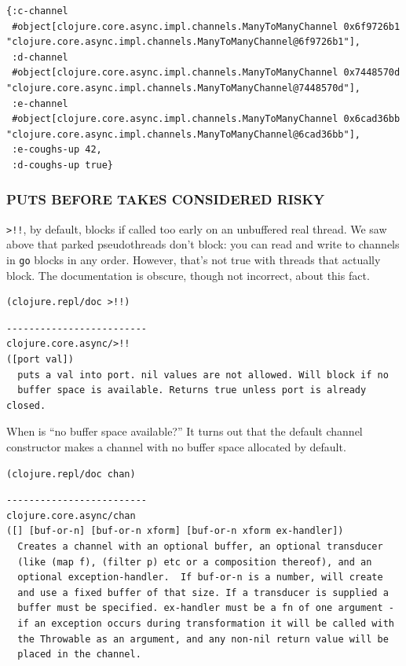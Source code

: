 \documentclass[10pt,oneside,x11names]{article}
\begin{document}
\begin{verbatim}
{:c-channel
 #object[clojure.core.async.impl.channels.ManyToManyChannel 0x6f9726b1 "clojure.core.async.impl.channels.ManyToManyChannel@6f9726b1"],
 :d-channel
 #object[clojure.core.async.impl.channels.ManyToManyChannel 0x7448570d "clojure.core.async.impl.channels.ManyToManyChannel@7448570d"],
 :e-channel
 #object[clojure.core.async.impl.channels.ManyToManyChannel 0x6cad36bb "clojure.core.async.impl.channels.ManyToManyChannel@6cad36bb"],
 :e-coughs-up 42,
 :d-coughs-up true}
\end{verbatim}

\subsubsection{PUTS BEFORE TAKES CONSIDERED RISKY}
\label{puts-before-takes-considered-risky}
\texttt{>!!}, by default, blocks if called too early on an unbuffered real
thread. We saw above that parked pseudothreads don't block: you can read
and write to channels in \texttt{go} blocks in any order. However, that's not
true with threads that actually block. The documentation is obscure,
though not incorrect, about this fact.

\begin{verbatim}
(clojure.repl/doc >!!)
\end{verbatim}

\begin{verbatim}
-------------------------
clojure.core.async/>!!
([port val])
  puts a val into port. nil values are not allowed. Will block if no
  buffer space is available. Returns true unless port is already closed.
\end{verbatim}


When is ``no buffer space available?'' It turns out that the default
channel constructor makes a channel with no buffer space allocated by
default.

\begin{verbatim}
(clojure.repl/doc chan)
\end{verbatim}

\begin{verbatim}
-------------------------
clojure.core.async/chan
([] [buf-or-n] [buf-or-n xform] [buf-or-n xform ex-handler])
  Creates a channel with an optional buffer, an optional transducer
  (like (map f), (filter p) etc or a composition thereof), and an
  optional exception-handler.  If buf-or-n is a number, will create
  and use a fixed buffer of that size. If a transducer is supplied a
  buffer must be specified. ex-handler must be a fn of one argument -
  if an exception occurs during transformation it will be called with
  the Throwable as an argument, and any non-nil return value will be
  placed in the channel.
\end{verbatim}
\end{document}
